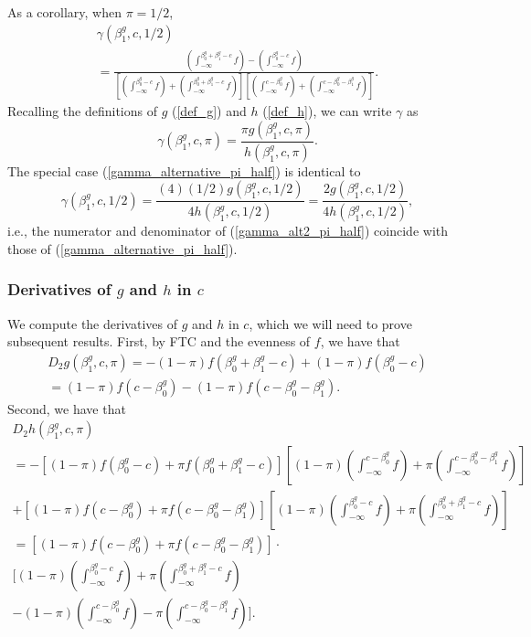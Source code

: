 \documentclass[12pt]{article}
\begin{document}
As a corollary, when $\pi = 1/2$,
\begin{multline}\label{gamma_alternative_pi_half}
\gamma(\beta^g_1, c, 1/2)  \\ = \frac{\left( \int_{ -\infty}^{\beta_0^g + \beta_1^g - c} f \right) - \left( \int_{-\infty}^{ \beta_0^g - c} f \right)}{\left[ \left( \int_{-\infty}^{ \beta_0^g - c} f \right) + \left( \int_{-\infty}^{ \beta^g_0 + \beta^g_1 - c} f \right) \right] \left[\left( \int_{-\infty}^{c - \beta^g_0} f \right) + \left(\int_{-\infty}^{c - \beta_0^g - \beta_1^g} f \right) \right]}.
\end{multline}
Recalling the definitions of $g$ (\ref{def_g}) and $h$ (\ref{def_h}), we can write $\gamma$ as
$$ \gamma(\beta^g_1, c, \pi) = \frac{\pi g(\beta^g_1, c, \pi)}{h(\beta^g_1, c,\pi)}.$$
The special case (\ref{gamma_alternative_pi_half}) is identical to
\begin{equation}\label{gamma_alt2_pi_half}
\gamma(\beta^g_1, c, 1/2) = \frac{(4)(1/2)g(\beta^g_1, c, 1/2)}{4 h(\beta^g_1, c, 1/2)} = \frac{2 g(\beta^g_1, c, 1/2)}{4h(\beta^g_1, c, 1/2)},
\end{equation}
i.e., the numerator and denominator of  (\ref{gamma_alt2_pi_half}) coincide with those of (\ref{gamma_alternative_pi_half}).

\subsubsection{Derivatives of  $g$ and $h$ in $c$}
We compute the derivatives of $g$ and $h$ in $c$, which we will need to prove subsequent results. First, by FTC and the evenness of $f$, we have that
\begin{multline}\label{dg_dc}
D_2 g(\beta^g_1, c, \pi) = -(1-\pi)f( \beta^g_0 + \beta^g_1 - c ) + (1-\pi) f(\beta^g_0 - c) \\ = (1-\pi) f(c - \beta^g_0) - (1-\pi)f(c - \beta^g_0 - \beta^g_1).
\end{multline}
Second, we have that
\begin{multline}\label{dh_dc}
D_2 h(\beta^g_1, c, \pi) \\ = -[(1-\pi)f(\beta^g_0 - c) + \pi f( \beta^g_0 + \beta^g_1 - c )]\left[(1-\pi)\left(\int_{-\infty}^{c - \beta^g_0} f \right) + \pi \left(\int_{-\infty}^{c - \beta_0^g - \beta_1^g} f \right) \right] \\ + [(1-\pi) f(c - \beta^g_0) +  \pi f(c - \beta^g_0 - \beta^g_1)] \left[(1-\pi)\left( \int_{-\infty}^{\beta_0^g - c} f \right) + \pi \left(\int_{-\infty}^{ \beta^g_0 + \beta^g_1 - c} f \right) \right] \\ = \left[ (1-\pi) f(c - \beta^g_0) +  \pi f(c - \beta^g_0 - \beta^g_1) \right] \cdot \\ \bigg[ (1-\pi)\left( \int_{-\infty}^{\beta_0^g - c} f \right) + \pi \left(\int_{-\infty}^{ \beta^g_0 + \beta^g_1 - c} f \right) \\ - (1-\pi)\left(\int_{-\infty}^{c - \beta^g_0} f \right) - \pi \left(\int_{-\infty}^{c - \beta_0^g - \beta_1^g} f \right) \bigg].
\end{multline}
\end{document}
